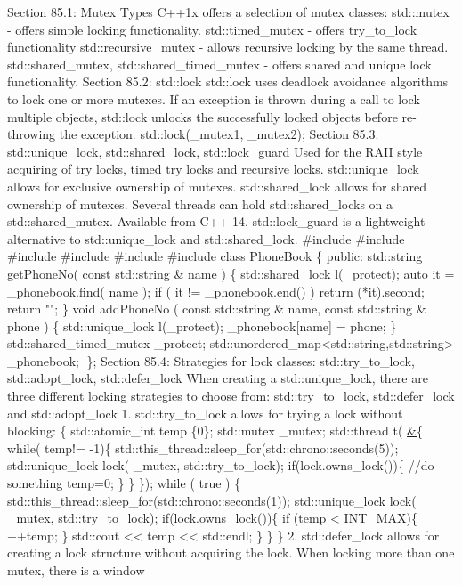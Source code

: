Section 85.1: Mutex Types C++1x oﬀers a selection of mutex classes:
std::mutex - oﬀers simple locking functionality. std::timed\_mutex -
oﬀers try\_to\_lock functionality std::recursive\_mutex - allows
recursive locking by the same thread. std::shared\_mutex,
std::shared\_timed\_mutex - oﬀers shared and unique lock functionality.
Section 85.2: std::lock std::lock uses deadlock avoidance algorithms to
lock one or more mutexes. If an exception is thrown during a call to
lock multiple objects, std::lock unlocks the successfully locked objects
before re-throwing the exception. std::lock(\_mutex1, \_mutex2); Section
85.3: std::unique\_lock, std::shared\_lock, std::lock\_guard Used for
the RAII style acquiring of try locks, timed try locks and recursive
locks. std::unique\_lock allows for exclusive ownership of mutexes.
std::shared\_lock allows for shared ownership of mutexes. Several
threads can hold std::shared\_locks on a std::shared\_mutex. Available
from C++ 14. std::lock\_guard is a lightweight alternative to
std::unique\_lock and std::shared\_lock. \#include \#include \#include
\#include \#include \#include class PhoneBook \{ public: std::string
getPhoneNo( const std::string \& name ) \{ std::shared\_lock
l(\_protect); auto it = \_phonebook.find( name ); if ( it !=
\_phonebook.end() ) return (*it).second; return ""; \} void addPhoneNo (
const std::string \& name, const std::string \& phone ) \{
std::unique\_lock l(\_protect); \_phonebook{[}name{]} = phone; \}
std::shared\_timed\_mutex \_protect;
std::unordered\_map\textless std::string,std::string\textgreater{}
\_phonebook; \}; Section 85.4: Strategies for lock classes:
std::try\_to\_lock, std::adopt\_lock, std::defer\_lock When creating a
std::unique\_lock, there are three diﬀerent locking strategies to choose
from: std::try\_to\_lock, std::defer\_lock and std::adopt\_lock 1.
std::try\_to\_lock allows for trying a lock without blocking: \{
std::atomic\_int temp \{0\}; std::mutex \_mutex; std::thread t(
\href{}{\&}\{ while( temp!= -1)\{
std::this\_thread::sleep\_for(std::chrono::seconds(5));
std::unique\_lock lock( \_mutex, std::try\_to\_lock);
if(lock.owns\_lock())\{ //do something temp=0; \} \} \}); while ( true )
\{ std::this\_thread::sleep\_for(std::chrono::seconds(1));
std::unique\_lock lock( \_mutex, std::try\_to\_lock);
if(lock.owns\_lock())\{ if (temp \textless{} INT\_MAX)\{ ++temp; \}
std::cout \textless\textless{} temp \textless\textless{} std::endl; \}
\} \} 2. std::defer\_lock allows for creating a lock structure without
acquiring the lock. When locking more than one mutex, there is a window

